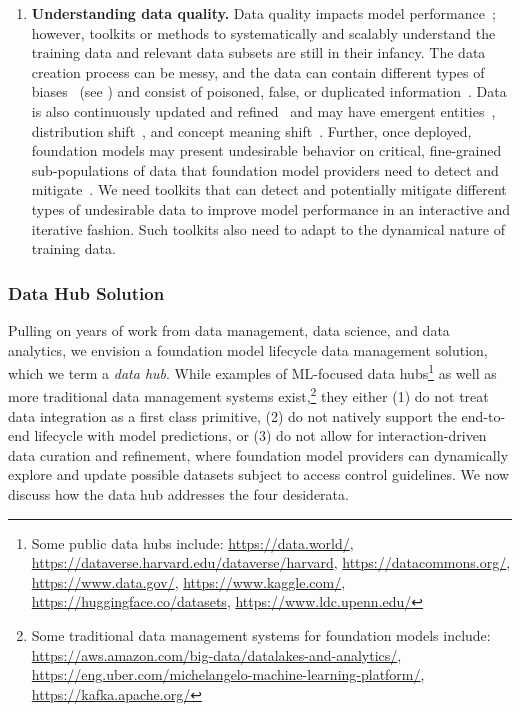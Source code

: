 \begin{enumerate}
    \item \textbf{Understanding data quality.} Data quality impacts model performance~\citep{lee2021deduplicating}; however, toolkits or methods to systematically and scalably understand the training data and relevant data subsets are still in their infancy. The data creation process can be messy, and the data can contain different types of biases~\citep{blodgett_language_2020, bender2021} (see ) and consist of poisoned, false, or duplicated information~\citep{chang2020adversarial, carlini2021poisoning, BuchananCSET2021, lee2021deduplicating}. Data is also continuously updated and refined~\citep{kiela2021dynabench} and may have emergent entities~\citep{fetahu2015much}, distribution shift~\citep{chen2021mandoline}, and concept meaning shift~\citep{kenter2015ad, lazaridou2021pitfalls}. Further, once deployed, foundation models may present undesirable behavior on critical, fine-grained sub-populations of data that foundation model providers need to detect and mitigate~\citep{goel2021robustnessgym, hohman2018visual, re2019overton, oakden2019hidden}. We need toolkits that can detect and potentially mitigate different types of undesirable data to improve model performance in an interactive and iterative fashion. Such toolkits also need to adapt to the dynamical nature of training data. 
\end{enumerate}

\subsubsection{Data Hub Solution}
\label{sec:data-solutions}
Pulling on years of work from data management, data science, and data analytics, we envision a foundation model lifecycle data management solution, which we term a \textit{data hub}. While examples of ML-focused data hubs\footnote{Some public data hubs include: \url{https://data.world/}, \url{https://dataverse.harvard.edu/dataverse/harvard}, \url{https://datacommons.org/}, \url{https://www.data.gov/}, \url{https://www.kaggle.com/}, \url{https://huggingface.co/datasets}, \url{https://www.ldc.upenn.edu/}} as well as more traditional data management systems exist,\footnote{Some traditional data management systems for foundation models include: \url{https://aws.amazon.com/big-data/datalakes-and-analytics/}, \url{https://eng.uber.com/michelangelo-machine-learning-platform/}, \url{https://kafka.apache.org/}} they either (1) do not treat data integration as a first class primitive, (2) do not natively support the end-to-end lifecycle with model predictions, or (3) do not allow for interaction-driven data curation and refinement, where foundation model providers can dynamically explore and update possible datasets subject to access control guidelines. We now discuss how the data hub addresses the four desiderata.

